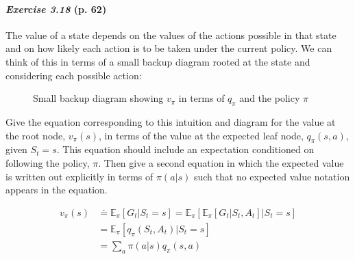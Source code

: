 \documentclass[10pt,a4paper]{article}
\begin{document}
\paragraph{\textit{Exercise 3.18} (p. 62)} The value of a state depends on the values of the actions possible in that state and on how likely each action is to be taken under the current policy. We can
think of this in terms of a small backup diagram rooted at the state and considering each
possible action:

\begin{figure}[h]
\centering
{}
\caption{Small backup diagram showing $v_\pi$ in terms of $q_\pi$ and the policy $\pi$}
\label{relation_state_value_action_value}
\end{figure}


Give the equation corresponding to this intuition and diagram for the value at the root node, $v_\pi(s)$, in terms of the value at the expected leaf node, $q_\pi(s, a)$, given $S_t = s$. This equation should include an expectation conditioned on following the policy, $\pi$. Then give
a second equation in which the expected value is written out explicitly in terms of $\pi(a|s)$ such that no expected value notation appears in the equation.

\bigskip
\begin{equation}
\begin{split}
v_\pi(s) &\doteq \mathbb{E}_\pi[G_t \lvert S_t = s] = \mathbb{E}_\pi\left[\mathbb{E}_\pi[G_t \lvert S_t, A_t] \lvert S_t = s\right]\\
&= \mathbb{E}_\pi[q_\pi(S_t, A_t) \lvert S_t = s]\\
&= \sum_{a} \pi(a \lvert s) q_\pi(s, a)
\end{split}
\end{equation}
\end{document}
